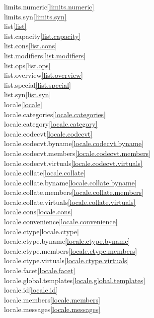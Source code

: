\begin{multicols}{2}
limits.numeric\quad\ref{limits.numeric}\\
limits.syn\quad\ref{limits.syn}\\
list\quad\ref{list}\\
list.capacity\quad\ref{list.capacity}\\
list.cons\quad\ref{list.cons}\\
list.modifiers\quad\ref{list.modifiers}\\
list.ops\quad\ref{list.ops}\\
list.overview\quad\ref{list.overview}\\
list.special\quad\ref{list.special}\\
list.syn\quad\ref{list.syn}\\
locale\quad\ref{locale}\\
locale.categories\quad\ref{locale.categories}\\
locale.category\quad\ref{locale.category}\\
locale.codecvt\quad\ref{locale.codecvt}\\
locale.codecvt.byname\quad\ref{locale.codecvt.byname}\\
locale.codecvt.members\quad\ref{locale.codecvt.members}\\
locale.codecvt.virtuals\quad\ref{locale.codecvt.virtuals}\\
locale.collate\quad\ref{locale.collate}\\
locale.collate.byname\quad\ref{locale.collate.byname}\\
locale.collate.members\quad\ref{locale.collate.members}\\
locale.collate.virtuals\quad\ref{locale.collate.virtuals}\\
locale.cons\quad\ref{locale.cons}\\
locale.convenience\quad\ref{locale.convenience}\\
locale.ctype\quad\ref{locale.ctype}\\
locale.ctype.byname\quad\ref{locale.ctype.byname}\\
locale.ctype.members\quad\ref{locale.ctype.members}\\
locale.ctype.virtuals\quad\ref{locale.ctype.virtuals}\\
locale.facet\quad\ref{locale.facet}\\
locale.global.templates\quad\ref{locale.global.templates}\\
locale.id\quad\ref{locale.id}\\
locale.members\quad\ref{locale.members}\\
locale.messages\quad\ref{locale.messages}\\

\end{multicols}
